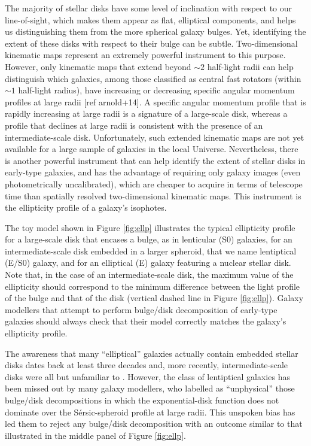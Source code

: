 \documentclass[12pt,preprint]{nature}
\begin{document}
The majority of stellar disks have some level of inclination with respect to our line-of-sight, 
which makes them appear as flat, elliptical components, 
and helps us distinguishing them from the more spherical galaxy bulges. 
Yet, identifying the extent of these disks with respect to their bulge can be subtle.
Two-dimensional kinematic maps represent an extremely powerful instrument to this purpose. 
However, only kinematic maps that extend beyond $\sim$$2$ half-light radii can help distinguish which galaxies, 
among those classified as central fast rotators (within $\sim$$1$ half-light radius), 
have increasing or decreasing specific angular momentum profiles at large radii [ref arnold+14]. 
A specific angular momentum profile that is rapidly increasing at large radii is a signature of a large-scale disk, 
whereas a profile that declines at large radii is consistent with the presence of an intermediate-scale disk. 
Unfortunately, such extended kinematic maps are not yet available for a large sample of galaxies in the local Universe. 
Nevertheless, there is another powerful instrument that can help identify the extent of 
stellar disks in early-type galaxies, 
and has the advantage of requiring only galaxy images (even photometrically uncalibrated), 
which are cheaper to acquire in terms of telescope time than spatially resolved two-dimensional kinematic maps. 
This instrument is the ellipticity profile of a galaxy's isophotes.

The toy model shown in Figure \ref{fig:ellp} illustrates the typical ellipticity profile 
for a large-scale disk that encases a bulge, as in lenticular (S0) galaxies, 
for an intermediate-scale disk embedded in a larger spheroid, that we name lentiptical (E/S0) galaxy, 
and for an elliptical (E) galaxy featuring a nuclear stellar disk. 
Note that, in the case of an intermediate-scale disk, 
the maximum value of the ellipticity should correspond to the minimum difference between the 
light profile of the bulge and that of the disk (vertical dashed line in Figure \ref{fig:ellp}). 
Galaxy modellers that attempt to perform bulge/disk decomposition of early-type galaxies 
should always check that their model correctly matches the galaxy's ellipticity profile.

The awareness that many ``elliptical'' galaxies actually contain embedded stellar disks 
dates back at least three decades 
\citep{capaccioli1987,carter1987,rixwhite1990,bender1990,scorzabender1990,nieto1991,rixwhite1992,scorzabender1995,
donofrio1995,graham1998fornax,scorza1998,scorzavandenbosch1998,bendersaglia1999} and, 
more recently, intermediate-scale disks were all but unfamiliar to \cite{krajnovic2013}. 
However, the class of lentiptical galaxies has been missed out by many galaxy modellers, 
who labelled as ``unphysical'' those bulge/disk decompositions in which 
the exponential-disk function does not dominate over the S\'ersic-spheroid profile at large radii. 
This unspoken bias has led them to reject any bulge/disk decomposition with an outcome 
similar to that illustrated in the middle panel of Figure \ref{fig:ellp}. 
\end{document}
